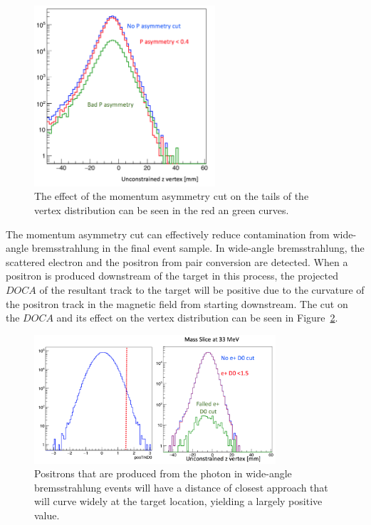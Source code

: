 \documentclass[twoside]{article}
\begin{document}
\begin{figure}[H]
  \centering
      \includegraphics[width=0.6\textwidth]{plots/pasycut.png}
  \caption{The effect of the momentum asymmetry cut on the tails of the vertex distribution can be seen in the red an green curves.}
  \label{fig:pasycut}
\end{figure} 

The momentum asymmetry cut can effectively reduce contamination from wide-angle bremsstrahlung in the final event sample. In wide-angle bremsstrahlung, the scattered electron and the positron from pair conversion are detected. When a positron is produced downstream of the target in this process, the projected $DOCA$ of the resultant track to the target will be positive due to the curvature of the positron track in the magnetic field from starting downstream. The cut on the $DOCA$ and its effect on the vertex distribution can be seen in Figure~\ref{fig:docacut}. 

\begin{figure}[H]
  \centering
      \includegraphics[width=0.8\textwidth]{plots/docacut.png}
  \caption{Positrons that are produced from the photon in wide-angle bremsstrahlung events will have a distance of closest approach that will curve widely at the target location, yielding a largely positive value.}
  \label{fig:docacut}
\end{figure} 
\end{document}
